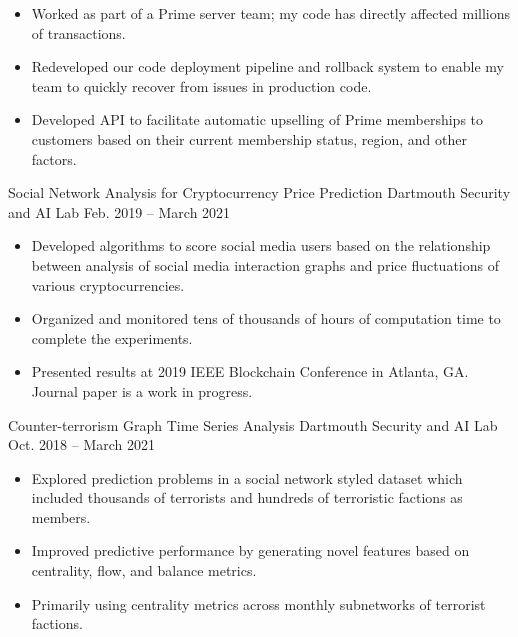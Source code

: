 \documentclass[11pt]{resume}
\begin{document}
    \begin{itemize}
        \item Worked as part of a Prime server team; my code has directly affected millions of
            transactions.
        \item Redeveloped our code deployment pipeline and rollback system to enable my team to 
            quickly recover from issues in production code.
        \item Developed API to facilitate automatic upselling of Prime memberships to customers 
            based on their current membership status, region, and other factors.
    \end{itemize}

    \medskip

    \datedentry
        {Social Network Analysis for Cryptocurrency Price Prediction}
        {Dartmouth Security and AI Lab}
        {Feb. 2019 -- March 2021}
        {}
    
    \begin{itemize}
        \item Developed algorithms to score social media users based on the relationship between 
            analysis of social media interaction graphs and price fluctuations of various 
            cryptocurrencies.
        \item Organized and monitored tens of thousands of hours of computation time to complete 
            the experiments.
        \item Presented results at 2019 IEEE Blockchain Conference in Atlanta, GA. Journal paper is
            a work in progress. 
    \end{itemize}

    \divider

    \datedentry
        {Counter-terrorism Graph Time Series Analysis}
        {Dartmouth Security and AI Lab}
        {Oct. 2018 -- March 2021}
        {}

    \begin{itemize}
        \item Explored prediction problems in a social network styled dataset which included thousands of terrorists and hundreds of 
            terroristic factions as members.
        \item Improved predictive performance by generating novel features based on centrality, flow, and balance metrics.
            \item Primarily using centrality metrics across monthly subnetworks of terrorist factions.
    \end{itemize}
\end{document}
